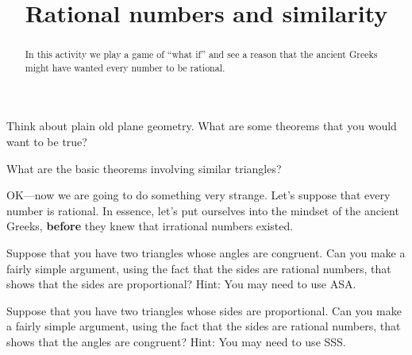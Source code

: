 \documentclass[nooutcomes]{ximera}
\title{Rational numbers and similarity}
\begin{document}
\begin{abstract}
In this activity we play a game of ``what if'' and see a reason that
  the ancient Greeks might have wanted every number to be rational.
\end{abstract}  
\maketitle

\begin{exploration}
Think about plain old plane geometry. What are some theorems that you
would want to be true?
\end{exploration}



\begin{question}
What are the basic theorems involving similar triangles?
\end{question}

OK---now we are going to do something very strange. Let's suppose that
every number is rational. In essence, let's put ourselves into the
mindset of the ancient Greeks, \textbf{before} they knew that
irrational numbers existed.

\begin{exploration}
Suppose that you have two triangles whose angles are congruent. Can
you make a fairly simple argument, using the fact that the sides are
rational numbers, that shows that the sides are proportional? Hint:
You may need to use ASA.
\end{exploration}


\begin{exploration}
Suppose that you have two triangles whose sides are proportional. Can
you make a fairly simple argument, using the fact that the sides are
rational numbers, that shows that the angles are congruent? Hint: You
may need to use SSS.
\end{exploration}
\end{document}
